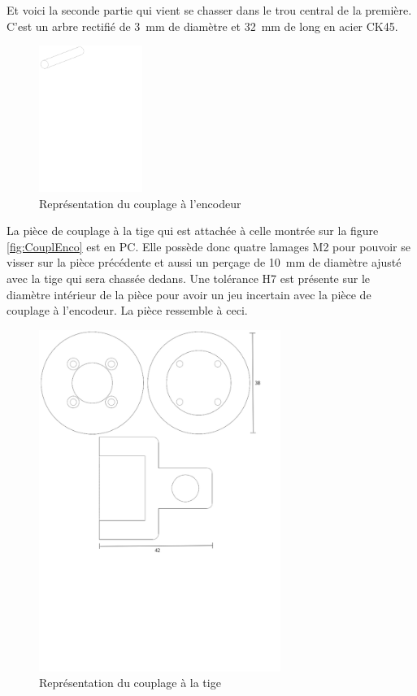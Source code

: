 Et voici la seconde partie qui vient se chasser dans le trou central de la première. C'est un arbre rectifié de 3~mm de diamètre et 32~mm
de long en acier CK45.
\begin{figure}[H]
    \centering
    \includegraphics[width = 0.3\textwidth]{assets/figures/CouplageEncodeur2.svg}
    \caption{Représentation du couplage à l'encodeur}
    \label{fig:CouplEnco2}
\end{figure}

La pièce de couplage à la tige qui est attachée à celle montrée sur la figure \ref{fig:CouplEnco} est en \acrshort{PC}. Elle possède donc quatre
lamages M2 pour pouvoir se visser sur la pièce précédente et aussi un perçage de 10~mm de diamètre ajusté avec la tige qui sera chassée dedans.
Une tolérance H7 est présente sur le diamètre intérieur de la pièce pour avoir un jeu incertain avec la pièce de couplage à l'encodeur.
La pièce ressemble à ceci.

\begin{figure}[H]
    \centering
    \includegraphics[width = 0.7\textwidth]{assets/figures/CouplageTige.svg}
    \caption{Représentation du couplage à la tige}
    \label{fig:CouplTige}
\end{figure}

